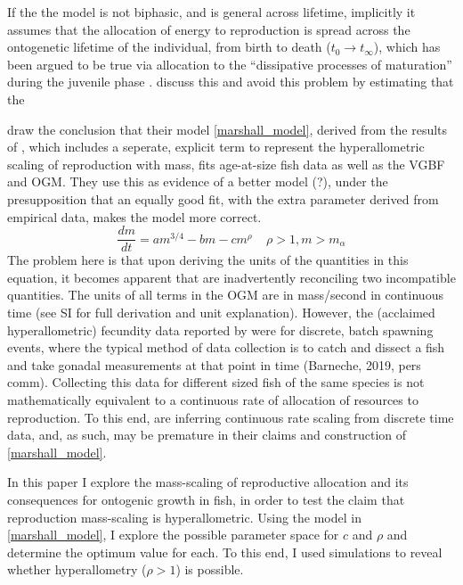 \documentclass[a4paper]{article} %
\begin{document}
        If the the model is not biphasic, and is general across lifetime, implicitly it assumes that the allocation of energy to reproduction is spread across the ontogenetic lifetime of the individual, from birth to death ($t_0 \rightarrow t_{\infty}$), which has been argued to be true via allocation to the ``dissipative processes of maturation'' during the juvenile phase \autocite{Kearney2019}. \cite{West2001} discuss this and avoid this problem by estimating that the 
        
        \cite{Marshall2019b} draw the conclusion that their model \eqref{marshall_model}, derived from the results of \cite{Barneche2018d}, which includes a seperate, explicit term to represent the hyperallometric scaling of reproduction with mass, fits age-at-size fish data as well as the VGBF and \cite{West2001} OGM. They use this as evidence of a better model (?), under the presupposition that an equally good fit, with the extra parameter derived from empirical data, makes the model more correct. 
            \begin{equation}
                \frac{dm}{dt} = am^{3/4} - bm - cm^{\rho} \ \ \ \ \ \rho > 1, m > m_{\alpha} \label{marshall_model}
            \end{equation}        
        The problem here is that upon deriving the units of the quantities in this equation, it becomes apparent that \cite{Marshall2019b} are inadvertently reconciling two incompatible quantities. The units of all terms in the OGM are in mass/second in continuous time (see SI for full derivation and unit explanation). However, the (acclaimed hyperallometric) fecundity data reported by \cite{Barneche2018d} were for discrete, batch spawning events, where the typical method of data collection is to catch and dissect a fish and take gonadal measurements at that point in time (Barneche, 2019, pers comm). Collecting this data for different sized fish of the same species is not mathematically equivalent to a continuous rate of allocation of resources to reproduction. To this end, \cite{Marshall2019b} are inferring continuous rate scaling from discrete time data, and, as such, may be premature in their claims and construction of \eqref{marshall_model}. 
        
        In this paper I explore the mass-scaling of reproductive allocation and its consequences for ontogenic growth in fish, in order to test the claim that reproduction mass-scaling is hyperallometric. Using the model in \eqref{marshall_model}, I explore the possible parameter space for $c$ and $\rho$ and determine the optimum value for each. To this end, I used simulations to reveal whether hyperallometry ($\rho > 1$) is possible. 
        
\end{document}
